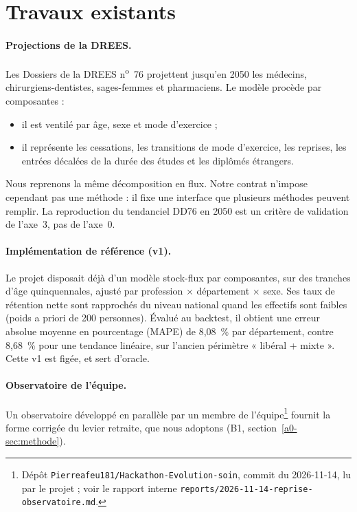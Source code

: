 \section{Travaux existants}

\paragraph{Projections de la DREES.} Les Dossiers de la DREES n\textsuperscript{o}~76
\citep{a0-drees2021dd76} projettent jusqu'en 2050 les médecins, chirurgiens-dentistes, sages-femmes et
pharmaciens. Le modèle procède par composantes :
\begin{itemize}
  \item il est ventilé par âge, sexe et mode d'exercice ;
  \item il représente les cessations, les transitions de mode d'exercice, les reprises, les entrées
        décalées de la durée des études et les diplômés étrangers.
\end{itemize}
Nous reprenons la même décomposition en flux. Notre contrat n'impose cependant pas une méthode : il
fixe une interface que plusieurs méthodes peuvent remplir. La reproduction du tendanciel DD76 en 2050
est un critère de validation de l'axe~3, pas de l'axe~0.

\paragraph{Implémentation de référence (v1).} Le projet disposait déjà d'un modèle stock-flux par
composantes, sur des tranches d'âge quinquennales, ajusté par profession $\times$ département $\times$
sexe. Ses taux de rétention nette sont rapprochés du niveau national quand les effectifs sont faibles
(poids a priori de 200\suppose{} personnes). Évalué au backtest, il obtient une erreur absolue moyenne
en pourcentage (MAPE) de 8,08\mesure{}~\% par département, contre 8,68\mesure{}~\% pour une tendance
linéaire, sur l'ancien périmètre « libéral + mixte ». Cette v1 est figée, et sert d'oracle.

\paragraph{Observatoire de l'équipe.} Un observatoire développé en parallèle par un membre de
l'équipe\footnote{Dépôt \texttt{Pierreafeu181/Hackathon-Evolution-soin}, commit du 2026-11-14, lu par
le projet ; voir le rapport interne \texttt{reports/2026-11-14-reprise-observatoire.md}.} fournit la
forme corrigée du levier retraite, que nous adoptons (B1, section~\ref{a0-sec:methode}).

